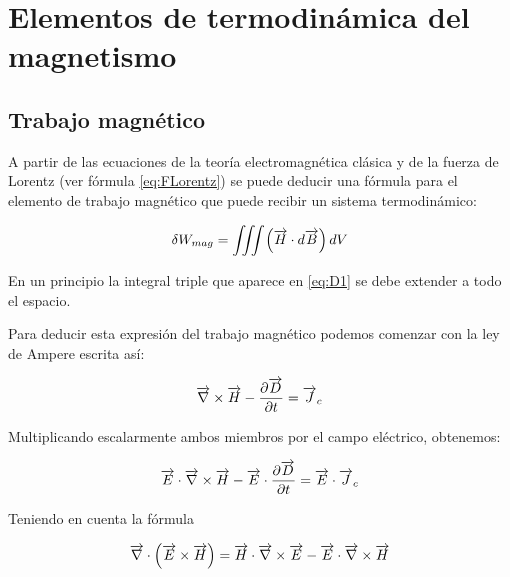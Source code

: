
\chapter{Elementos de termodinámica del magnetismo} %

\label{AppendixTermodinámicaDelMagnetismo} %




\section{Trabajo magnético}

A partir de las ecuaciones de la teoría electromagnética clásica y de la fuerza de Lorentz (ver fórmula \ref{eq:FLorentz}) se puede deducir una fórmula para el elemento de trabajo magnético que puede recibir un
sistema termodinámico: 

\begin{equation}
	\label{eq:D1}
	\delta W_{mag}=\iiint \left(\overrightarrow{H}\cdot d\overrightarrow{B} \right) dV
\end{equation}

En un principio la integral triple que aparece en \ref{eq:D1} se debe extender a todo el espacio. 

Para deducir esta expresión del trabajo magnético podemos comenzar con la ley de Ampere escrita así: 

\begin{equation*}
	\overrightarrow{\nabla}\times\overrightarrow{H}-\dfrac{\partial \overrightarrow{D}}{\partial t}=\overrightarrow{J}_{c}
\end{equation*}

Multiplicando escalarmente ambos miembros por el campo eléctrico, obtenemos: 

\begin{equation*}
	\overrightarrow{E}\cdot\overrightarrow{\nabla}\times\overrightarrow{H}-\overrightarrow{E}\cdot\dfrac{\partial \overrightarrow{D}}{\partial t}=\overrightarrow{E}\cdot\overrightarrow{J}_{c}
\end{equation*}

Teniendo en cuenta la fórmula

\begin{equation*}
	\overrightarrow{\nabla}\cdot \left( \overrightarrow{E}\times\overrightarrow{H} \right) = \overrightarrow{H}\cdot\overrightarrow{\nabla}\times\overrightarrow{E}-\overrightarrow{E}\cdot\overrightarrow{\nabla}\times\overrightarrow{H}
\end{equation*}

